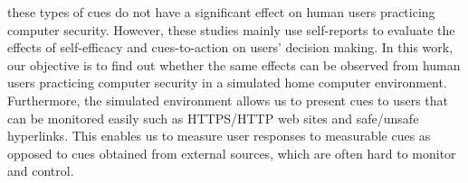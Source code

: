 \documentclass[doctor]{thesis} %
\theoremstyle{plain}
\begin{document}
these types of cues do not have a significant effect on human users practicing computer security.  However, these studies mainly use self-reports to evaluate the effects of self-efficacy and cues-to-action on users' decision making. In this work, our objective is to find out whether the same effects can be observed from human users practicing computer security in a simulated home computer environment. Furthermore, the simulated environment allows us to present cues to users that can be monitored easily such as HTTPS/HTTP web sites and safe/unsafe hyperlinks. This enables us to measure user responses to measurable cues as opposed to cues obtained from external sources, which are often hard to monitor and control.
%
%
\end{document}
